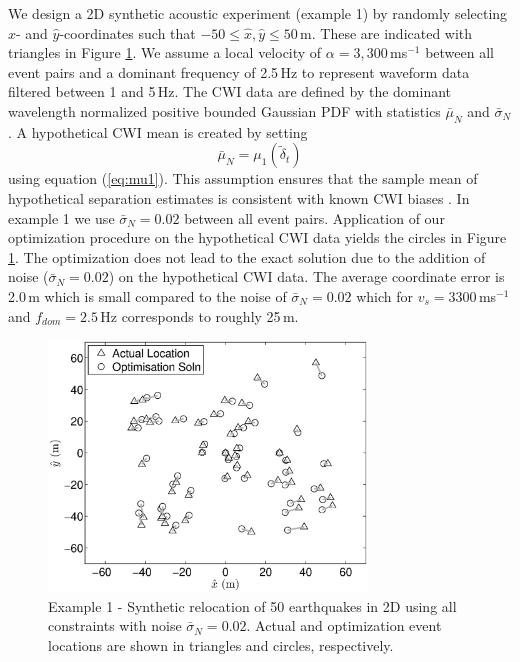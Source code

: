 \documentclass[extra, onecolumn, doublespacing]{gji}
\begin{document}
We design a 2D synthetic acoustic experiment (example 1) by randomly
selecting $\hat{x}$- and $\hat{y}$-coordinates such that $-50 \leq
\hat{x}, \hat{y} \leq 50$\,m. These are indicated with triangles in
Figure \ref{fig-2D50eq-relocation_eg1}.
 We assume a local velocity of $\alpha=3,300\,$ms$^{-1}$ between all
event pairs and a dominant frequency of 2.5$\,$Hz to represent
waveform data filtered between 1 and 5$\,$Hz. The CWI data are
defined by the dominant wavelength normalized positive bounded
Gaussian PDF with statistics $\bar{\mu}_N$ and $\bar{\sigma}_N$
\citep{dr_Robinson11a}. A hypothetical CWI mean is created by
setting
\begin{equation}
\label{eq:hypothetical-CWI-mean-optichapt}
\bar{\mu}_N = \mu_1 \left( \widetilde{\delta}_t \right)
\end{equation}
using equation (\ref{eq:mu1}). This assumption ensures that the
sample mean of hypothetical separation estimates is consistent with
known CWI biases \citep{dr_Robinson11a}. In example 1 we use
$\bar{\sigma}_N=0.02$ between all event pairs. Application of our
optimization procedure on the hypothetical CWI data yields the
circles in Figure \ref{fig-2D50eq-relocation_eg1}. The optimization
does not lead to the exact solution due to the addition of noise
($\bar{\sigma}_N=0.02$) on the hypothetical CWI data. The average
coordinate error is 2.0\,m which is small compared to the noise of
$\bar{\sigma}_N=0.02$ which for $v_s=3300$\,ms$^{-1}$ and
$f_{dom}=2.5$\,Hz corresponds to roughly 25\,m.
\begin{figure}
\includegraphics[width = 20pc]{diags/locs_2D_50eq_1.eps}
\caption{Example 1 - Synthetic relocation of 50 earthquakes in 2D
using all constraints with noise $\bar{\sigma}_N=0.02$. Actual and
optimization event locations are shown in triangles and circles,
respectively.} \label{fig-2D50eq-relocation_eg1}
\end{figure}
\end{document}
